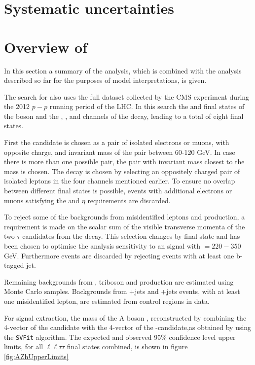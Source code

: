 \section{Systematic uncertainties}
\label{sec:hhh_uncs}

\section{\texorpdfstring{Overview of \AtoZhtolltautau}{Overview of A->Zh->lltautau}}
\label{sec:hhh_azh}
In this section a summary of the \AtoZhtolltautau analysis, which is combined with the 
analysis described so far for the purposes of model interpretations, is given.

The search for \AtoZhtolltautau also uses the full dataset collected by the CMS experiment during
the 2012 $p-p$ running period of the LHC. In this search the \mumu and \ee final states of the \PZ boson
and the \emu, \etau, \mutau and \tautau channels of the \htotautau decay, leading to a total of
eight final states. 

First the \PZ candidate is chosen as a pair of isolated electrons or muons, with opposite charge, and 
invariant mass of the pair between 60-120 GeV. In case there is more than one possible pair, the 
pair with invariant mass closest to the \PZ mass is chosen. The \htotautau decay is chosen by selecting
an oppositely charged pair of isolated leptons in the four channels mentioned earlier. To ensure no overlap
between different final states is possible, events with additional electrons or muons satisfying the
\pT and $\eta$ requirements are discarded.

To reject some of the backgrounds from misidentified leptons and \ZZ production, a requirement is made
on the scalar sum of the visible transverse momenta of the two $\tau$ candidates from the \htotautau decay.
This selection changes by final state and has been chosen to optimise the analysis sensitivity to an 
\AtoZh signal with \mA $= 220 - 350 $ GeV. Furthermore \ttbar events are discarded by rejecting
events with at least one b-tagged jet. 

Remaining backgrounds from \ZZ, triboson and \ttbar\PZ production are estimated using
Monte Carlo samples. Backgrounds from \PZ+jets %
and \WZ+jets %
events, with at least one misidentified lepton, are estimated from control regions in data.

For signal extraction, the mass of the A boson \mA, reconstructed by combining the
4-vector of the \PZ candidate with the 4-vector of the \Ph -candidate,as obtained by using the 
\texttt{SVFit} algorithm. The expected and observed 95\% confidence level upper limits, for
all $\ell\ell\tau\tau$ final states combined, is shown in figure \ref{fig:AZhUpperLimits}

